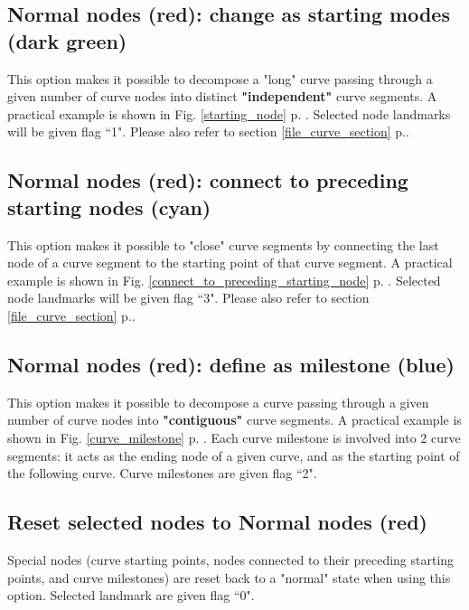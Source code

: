 \subsection{Normal nodes (red): change as starting modes (dark green)}\label{section_curve_segment1}
This option makes it possible to decompose a "long" curve passing through a given number of curve nodes into distinct \textbf{"independent"} curve segments. A practical example is shown in Fig. \ref{starting_node} p. \pageref{starting_node}. Selected node landmarks will be given flag ``1". Please also refer to section \ref{file_curve_section} p.\pageref{file_curve_section}.


\subsection{Normal nodes (red): connect to preceding starting nodes (cyan)}
This option makes it possible to "close" curve segments by connecting the last node of a curve segment to the starting point of that curve segment. A practical example is shown in Fig. \ref{connect_to_preceding_starting_node} p. \pageref{connect_to_preceding_starting_node}. Selected node landmarks will be given flag ``3". Please also refer to section \ref{file_curve_section} p.\pageref{file_curve_section}.



\subsection{Normal nodes (red): define as milestone (blue)}\label{section_curve_segment2}
This option makes it possible to decompose a curve passing through a given number of curve nodes into \textbf{"contiguous"} curve segments. A practical example is shown in Fig. \ref{curve_milestone} p. \pageref{curve_milestone}. Each curve milestone is involved into 2 curve segments: it acts as the ending node of a given curve, and as the starting point of the following curve. Curve milestones are given flag ``2".




\subsection{Reset selected nodes to Normal nodes (red)}
Special nodes (curve starting points, nodes connected to their preceding starting points, and curve milestones) are reset back to a "normal" state when using this option. Selected landmark are given flag ``0".

